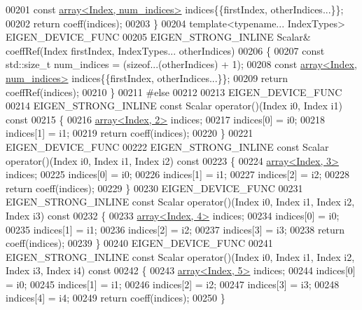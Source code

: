 \begin{DoxyCode}
00201       \textcolor{keyword}{const} \hyperlink{class_eigen_1_1array}{array<Index, num\_indices>} indices\{\{firstIndex, otherIndices...\}\};
00202       \textcolor{keywordflow}{return} coeff(indices);
00203     \}
00204     \textcolor{keyword}{template}<\textcolor{keyword}{typename}... IndexTypes> EIGEN\_DEVICE\_FUNC
00205     EIGEN\_STRONG\_INLINE Scalar& coeffRef(Index firstIndex, IndexTypes... otherIndices)
00206     \{
00207       \textcolor{keyword}{const} std::size\_t num\_indices = (\textcolor{keyword}{sizeof}...(otherIndices) + 1);
00208       \textcolor{keyword}{const} \hyperlink{class_eigen_1_1array}{array<Index, num\_indices>} indices\{\{firstIndex, otherIndices...\}\};
00209       \textcolor{keywordflow}{return} coeffRef(indices);
00210     \}
00211 \textcolor{preprocessor}{#else}
00212 
00213     EIGEN\_DEVICE\_FUNC
00214     EIGEN\_STRONG\_INLINE \textcolor{keyword}{const} Scalar operator()(Index i0, Index i1)\textcolor{keyword}{ const}
00215 \textcolor{keyword}{    }\{
00216       \hyperlink{class_eigen_1_1array}{array<Index, 2>} indices;
00217       indices[0] = i0;
00218       indices[1] = i1;
00219       \textcolor{keywordflow}{return} coeff(indices);
00220     \}
00221     EIGEN\_DEVICE\_FUNC
00222     EIGEN\_STRONG\_INLINE \textcolor{keyword}{const} Scalar operator()(Index i0, Index i1, Index i2)\textcolor{keyword}{ const}
00223 \textcolor{keyword}{    }\{
00224       \hyperlink{class_eigen_1_1array}{array<Index, 3>} indices;
00225       indices[0] = i0;
00226       indices[1] = i1;
00227       indices[2] = i2;
00228       \textcolor{keywordflow}{return} coeff(indices);
00229     \}
00230     EIGEN\_DEVICE\_FUNC
00231     EIGEN\_STRONG\_INLINE \textcolor{keyword}{const} Scalar operator()(Index i0, Index i1, Index i2, Index i3)\textcolor{keyword}{ const}
00232 \textcolor{keyword}{    }\{
00233       \hyperlink{class_eigen_1_1array}{array<Index, 4>} indices;
00234       indices[0] = i0;
00235       indices[1] = i1;
00236       indices[2] = i2;
00237       indices[3] = i3;
00238       \textcolor{keywordflow}{return} coeff(indices);
00239     \}
00240     EIGEN\_DEVICE\_FUNC
00241     EIGEN\_STRONG\_INLINE \textcolor{keyword}{const} Scalar operator()(Index i0, Index i1, Index i2, Index i3, Index i4)\textcolor{keyword}{ const}
00242 \textcolor{keyword}{    }\{
00243       \hyperlink{class_eigen_1_1array}{array<Index, 5>} indices;
00244       indices[0] = i0;
00245       indices[1] = i1;
00246       indices[2] = i2;
00247       indices[3] = i3;
00248       indices[4] = i4;
00249       \textcolor{keywordflow}{return} coeff(indices);
00250     \}

\end{DoxyCode}
